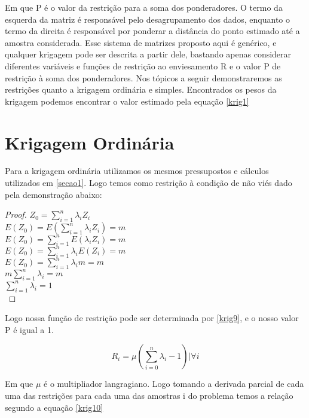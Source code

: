 Em que P é o valor da restrição para a soma dos ponderadores. O termo da esquerda da matriz é responsável pelo desagrupamento dos dados, enquanto o termo da direita é responsável por ponderar a distância do ponto estimado até a amostra considerada. Esse sistema de matrizes proposto aqui é genérico, e qualquer krigagem pode ser descrita a partir dele, bastando apenas considerar diferentes variáveis e funções de restrição ao enviesamento R e o valor P de restrição à soma dos ponderadores. Nos tópicos a seguir demonstraremos as restrições quanto a krigagem ordinária e simples. Encontrados os pesos da krigagem podemos encontrar o valor estimado pela equação \eqref{krig1}

\section{Krigagem Ordinária}

 Para a krigagem ordinária utilizamos os mesmos pressupostos e cálculos utilizados em \ref{secao1}. Logo temos como restrição à condição de não viés dado pela demonstração abaixo:
 
 \begin{proof}
    	$Z_{0} = \sum_{i=1}^{n} \lambda_{i} Z_{i} $\\
    	$E(Z_{0}) = E\left(\sum_{i=1}^{n} \lambda_{i} Z_{i}\right) =m $\\
    	$E(Z_{0}) =\sum_{i=1}^{n}  E\left(\lambda_{i} Z_{i}\right) = m $\\
    	$E(Z_{0}) =\sum_{i=1}^{n}  \lambda_{i} E\left(Z_{i}\right) = m $\\
    	$E(Z_{0}) =\sum_{i=1}^{n}  \lambda_{i} m = m $\\
    	$m\sum_{i=1}^{n}  \lambda_{i} = m $\\
    	$\sum_{i=1}^{n}  \lambda_{i} = 1 $\\
 \end{proof}
 
 Logo nossa função de restrição pode ser determinada por \eqref{krig9}, e o nosso valor P é igual a 1.
 
 \begin{equation}\label{krig9}
 R_{i} = \mu \left( \sum_{i=0}^{n} \lambda_{i} - 1\right) | \forall i
 \end{equation} 

 Em que $\mu$ é o multipliador langragiano. Logo tomando a derivada parcial de cada uma das restrições para cada uma das amostras i do problema temos a relação segundo a equação \eqref{krig10}
 
